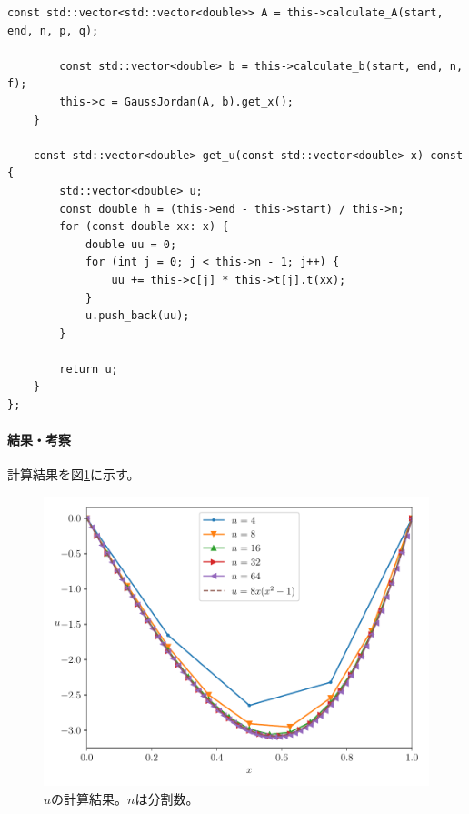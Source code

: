 \documentclass[a4j, titlepage]{jsarticle}
\numberwithin{equation}{section}
\begin{document}
\begin{lstlisting}[caption=有限要素法の実装, label=src:fem]
        const std::vector<std::vector<double>> A = this->calculate_A(start, end, n, p, q);
        
        const std::vector<double> b = this->calculate_b(start, end, n, f);
        this->c = GaussJordan(A, b).get_x();
    }

    const std::vector<double> get_u(const std::vector<double> x) const {
        std::vector<double> u;
        const double h = (this->end - this->start) / this->n;
        for (const double xx: x) {
            double uu = 0;
            for (int j = 0; j < this->n - 1; j++) {
                uu += this->c[j] * this->t[j].t(xx);
            }
            u.push_back(uu);
        }

        return u;
    }
};
            \end{lstlisting}

            \paragraph{結果・考察}
                計算結果を図\ref{fig:fem}に示す。
                \begin{figure}[h]
                    \centering
                    \includegraphics[width=0.8\hsize]{kadai4/main.pdf}
                    \caption{$u$の計算結果。$n$は分割数。}
                    \label{fig:fem}
                \end{figure}
\end{document}
